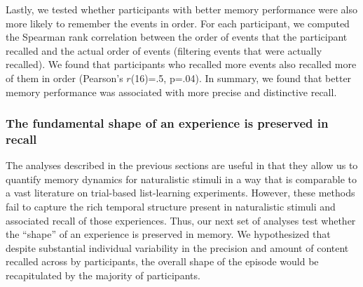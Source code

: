 \documentclass{article}
\begin{document}
{ Lastly, we tested whether participants with better memory performance were also more likely to remember the events in order.  For each participant, we computed the Spearman rank correlation between the order of events that the participant recalled and the actual order of events (filtering events that were actually recalled).  We found that participants who recalled more events also recalled more of them in order (Pearson's $r$(16)=.5, p=.04). In summary, we found that better memory performance was associated with more precise and distinctive recall.

\subsubsection{The fundamental shape of an experience is preserved in recall}
The analyses described in the previous sections are useful in that they allow us to quantify memory dynamics for naturalistic stimuli in a way that is comparable to a vast literature on trial-based list-learning experiments. However, these methods fail to capture the rich temporal structure present in naturalistic stimuli and associated recall of those experiences. Thus, our next set of analyses test whether the ``shape'' of an experience is preserved in memory. We hypothesized that despite substantial individual variability in the precision and amount of content recalled across by participants, the overall shape of the episode would be recapitulated by the majority of participants.

}
\end{document}
